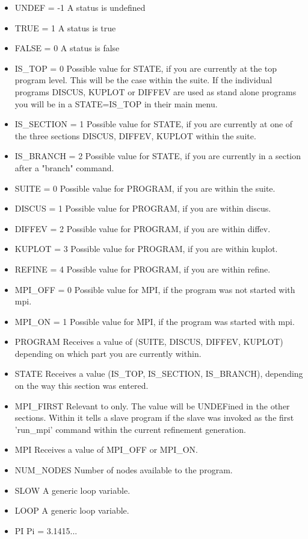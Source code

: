 \begin{itemize}
  \item UNDEF = -1  A status is undefined
  \item TRUE  = 1   A status is true
  \item FALSE = 0   A status is false
  \item IS\_TOP = 0 Possible value for STATE, if you are currently at the
                    top program level. This will be the case within the
                    suite. If the individual programs DISCUS, KUPLOT
                    or DIFFEV are used as stand alone programs you will 
                    be in a STATE=IS\_TOP in their main menu.
  \item IS\_SECTION = 1  Possible value for STATE, if you are currently at
                    one of the three sections DISCUS, DIFFEV, KUPLOT
                    within the suite.
  \item IS\_BRANCH = 2  Possible value for STATE, if you are currently in
                    a section after a "branch" command. 
  \item SUITE = 0   Possible value for PROGRAM, if you are within the suite.
  \item DISCUS = 1   Possible value for PROGRAM, if you are within discus.
  \item DIFFEV = 2   Possible value for PROGRAM, if you are within diffev.
  \item KUPLOT = 3   Possible value for PROGRAM, if you are within kuplot.
  \item REFINE = 4   Possible value for PROGRAM, if you are within refine.
  \item MPI\_OFF = 0 Possible value for MPI, if the program was not started
                     with mpi.
  \item MPI\_ON  = 1 Possible value for MPI, if the program was started
                     with mpi.
  \item PROGRAM      Receives a value of (SUITE, DISCUS, DIFFEV, KUPLOT)
                     depending on which part you are currently within.
  \item STATE        Receives a value (IS\_TOP, IS\_SECTION, IS\_BRANCH),
                     depending on the way this section was entered.
  \item MPI\_FIRST   Relevant to \Diffev only. The value will be UNDEFined
                     in the other sections. Within \Diffev it tells a 
                     slave program if the slave was invoked as the first
                     'run\_mpi' command within the current refinement generation.
  \item MPI          Receives a value of MPI\_OFF or MPI\_ON. 
  \item NUM\_NODES   Number of nodes available to the program. 
  \item SLOW         A generic loop variable.
  \item LOOP         A generic loop variable.
  \item PI           Pi = 3.1415... 
\end{itemize}  


